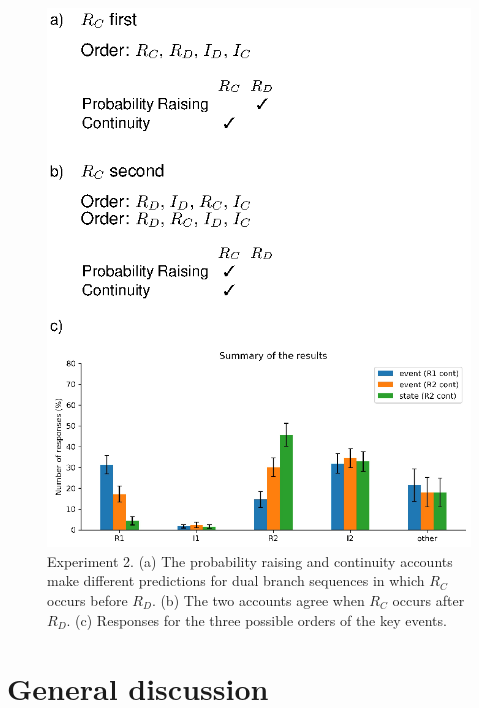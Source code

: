 \documentclass[10pt,letterpaper]{article}
\newcommand{\ev}[2]{$#1_#2$}
\begin{document}
\begin{figure}
\begin{center}
\includegraphics{figures/expt2.eps}
\end{center}
\caption{Experiment 2. (a) The probability raising and continuity accounts make different predictions for dual branch sequences in which \ev{R}{C} occurs before \ev{R}{D}. (b) The two accounts agree when \ev{R}{C} occurs after \ev{R}{D}.
(c) Responses for the three possible orders of the key events.} 
\label{fig:expt2}
\end{figure}

\section{General discussion}
\end{document}
